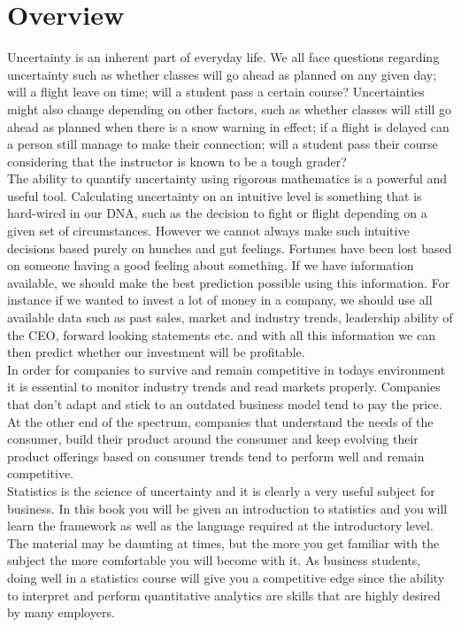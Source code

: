\setcounter{page}{1}
\chapter{Overview}
\pagestyle{myheadings}  

\setcounter{equation}{0}



Uncertainty is an inherent part of everyday life. 
We all face questions regarding uncertainty such as whether 
classes will go ahead as planned on any given day;
will a flight leave on time; 
will a student pass a certain course?
Uncertainties might also change depending on other factors, 
such as whether classes will still go ahead as planned when there is a snow warning in effect;
if a flight is delayed can a person still manage to make their connection;
will a student pass their course considering that the instructor is known to be a tough grader?\\

The ability to quantify uncertainty using rigorous mathematics is a powerful and useful tool.
Calculating uncertainty on an intuitive level is something that is hard-wired in our DNA, 
such as the decision to fight or flight depending on a given set of circumstances.
However we cannot always make such intuitive decisions
based purely on hunches and gut feelings.
Fortunes have been lost based on someone having a good feeling about something.
If we have information available, we should make the best prediction possible using this information.
For instance if we wanted to invest a lot of money in a company, we should use all available data such as
past sales, market and industry trends, leadership ability of the CEO, forward looking statements etc. 
and with all this information we can then predict whether our investment will be profitable.\\

In order for companies to survive and remain competitive in todays 
environment it is essential to monitor industry trends and read markets properly.
Companies that don't adapt and stick to an outdated business model
tend to pay the price.
At the other end of the spectrum, companies that understand the needs of the consumer, 
build their product around the consumer and keep evolving their product offerings based on
consumer trends tend to perform well and remain competitive.\\

Statistics is the science of uncertainty and it is clearly a very useful subject for business.
In this book you will be given an introduction to statistics and you will learn the
framework as well as the language required at the introductory level.
The material may be daunting at times, but the more you get familiar with the
subject the more comfortable you will become with it.
As business students, doing well in a statistics course will give you a competitive
edge since the ability to interpret and perform quantitative analytics are skills that are highly
desired by many employers.


